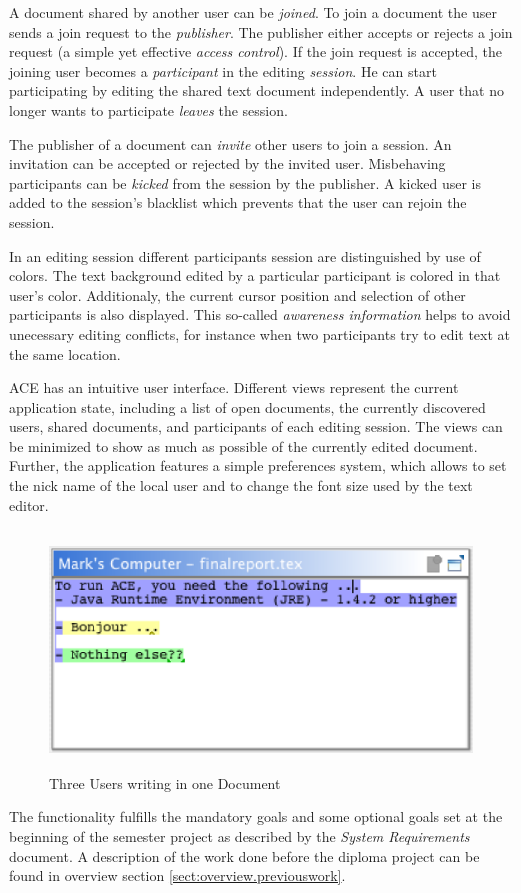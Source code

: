 A document shared by another user can be \emph{joined}. To join a document the user sends a join request to the \emph{publisher}. The publisher either accepts or rejects a join request (a simple yet effective \emph{access control}). If the join request is accepted, the joining user becomes a \emph{participant} in the editing \emph{session}. He can start participating by editing the shared text document independently. A user that no longer wants to participate \emph{leaves} the session.

The publisher of a document can \emph{invite} other users to join a session. An invitation can be accepted or rejected by the invited user. Misbehaving participants can be \emph{kicked} from the session by the publisher. A kicked user is added to the session's blacklist which prevents that the user can rejoin the session.

In an editing session different participants session are distinguished by use of colors. The text background edited by a particular participant is colored in that user's color. Additionaly, the current cursor position and selection of other participants is also displayed. This so-called \emph{awareness information} helps to avoid unecessary editing conflicts, for instance when two participants try to edit text at the same location.

ACE has an intuitive user interface. Different views represent the current application state, including a list of open documents, the currently discovered users, shared documents, and participants of each editing session. The views can be minimized to show as much as possible of the currently edited document. Further, the application features a simple preferences system, which allows to set the nick name of the local user and to change the font size used by the text editor.

\begin{figure}[H]
\begin{center}
  \includegraphics[height=2.5in, width=5.12in]{../images/usermanual/editor_collab_3users.eps}
\caption{Three Users writing in one Document}
\end{center}
\end{figure}

The functionality fulfills the mandatory goals and some optional goals set at the beginning of the semester project as described by the \emph{System Requirements} document. A description of the work done before the diploma project can be found in overview section \ref{sect:overview.previouswork}.
